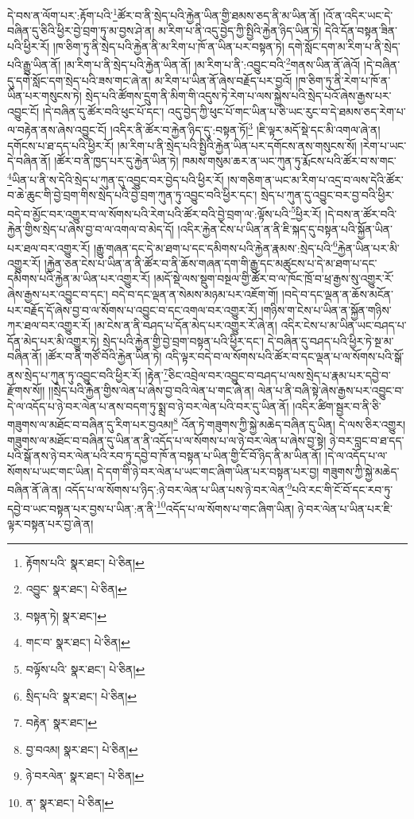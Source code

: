 དེ་བས་ན་ལོག་པར་:རྟོག་པའི་\footnote{རྟོགས་པའི་  སྣར་ཐང་།  པེ་ཅིན། }ཚོར་བ་ནི་སྲེད་པའི་རྐྱེན་ཡིན་གྱི་ཐམས་ཅད་ནི་མ་ཡིན་ནོ། །འོ་ན་འདིར་ཡང་དེ་བཞིན་དུ་ཅིའི་ཕྱིར་བྱེ་བྲག་ཏུ་མ་བྱས་ཤེ་ན། མ་རིག་པ་ནི་འདུ་བྱེད་ཀྱི་སྤྱིའི་རྐྱེན་ཉིད་ཡིན་ཏེ། དེའི་དོན་བསྟན་ཟིན་པའི་ཕྱིར་རོ། །ཁ་ཅིག་ཏུ་ནི་སྲེད་པའི་རྐྱེན་ནི་མ་རིག་པ་ཁོ་ན་ཡིན་པར་བསྟན་ཏེ། དགེ་སློང་དག་མ་རིག་པ་ནི་སྲེད་པའི་རྒྱུ་ཡིན་ནོ། །མ་རིག་པ་ནི་སྲེད་པའི་རྐྱེན་ཡིན་ནོ། །མ་རིག་པ་ནི་:འབྱུང་བའི་\footnote{འབྱུང་  སྣར་ཐང་།  པེ་ཅིན། }གནས་ཡིན་ནོ་ཞེའོ། །དེ་བཞིན་དུ་དགེ་སློང་དག་སྲེད་པའི་ཟས་གང་ཞེ་ན། མ་རིག་པ་ཡིན་ནོ་ཞེས་བརྗོད་པར་བྱའོ། །ཁ་ཅིག་ཏུ་ནི་རེག་པ་ཁོ་ན་ཡིན་པར་གསུངས་ཏེ། སྲེད་པའི་ཚོགས་དྲུག་ནི་མིག་གི་འདུས་ཏེ་རེག་པ་ལས་སྐྱེས་པའི་སྲེད་པའོ་ཞེས་རྒྱས་པར་འབྱུང་ངོ། །དེ་བཞིན་དུ་ཚོར་བའི་ཕུང་པོ་དང་། འདུ་བྱེད་ཀྱི་ཕུང་པོ་གང་ཡིན་པ་ཅི་ཡང་རུང་བ་དེ་ཐམས་ཅད་རེག་པ་ལ་བརྟེན་ནས་ཞེས་འབྱུང་ངོ། །འདིར་ནི་ཚོར་བ་རྐྱེན་ཉིད་དུ་:བསྟན་ཏོ།\footnote{བསྟན་ཏེ།  སྣར་ཐང་། } །ཇི་ལྟར་མདོ་སྡེ་དང་མི་འགལ་ཞེ་ན། དགོངས་པ་ཐ་དད་པའི་ཕྱིར་རོ། །མ་རིག་པ་ནི་སྲེད་པའི་སྤྱིའི་རྐྱེན་ཡིན་པར་དགོངས་ནས་གསུངས་སོ། །རེག་པ་ཡང་དེ་བཞིན་ནོ། །ཚོར་བ་ནི་ཁྱད་པར་དུ་རྐྱེན་ཡིན་ཏེ། ཁམས་གསུམ་ཆར་ན་ཡང་ཀུན་ཏུ་རྨོངས་པའི་ཚོར་བ་ས་གང་\footnote{གང་བ་  སྣར་ཐང་།  པེ་ཅིན། }ཡིན་པ་ནི་ས་དེའི་སྲེད་པ་ཀུན་དུ་འབྱུང་བར་བྱེད་པའི་ཕྱིར་རོ། །ས་གཅིག་ན་ཡང་མ་རིག་པ་འདྲ་བ་ལས་དེའི་ཚོར་བ་ཆེ་ཆུང་གི་བྱེ་བྲག་གིས་སྲེད་པའི་བྱེ་བྲག་ཀུན་ཏུ་འབྱུང་བའི་ཕྱིར་དང་། སྲེད་པ་ཀུན་དུ་འབྱུང་བར་བྱ་བའི་ཕྱིར་བདེ་བ་མྱོང་བར་འགྱུར་བ་ལ་སོགས་པའི་རེག་པའི་ཚོར་བའི་བྱེ་བྲག་ལ་:ལྟོས་པའི་\footnote{བལྟོས་པའི་  སྣར་ཐང་།  པེ་ཅིན། }ཕྱིར་རོ། །དེ་བས་ན་ཚོར་བའི་རྐྱེན་གྱིས་སྲེད་པ་ཞེས་བྱ་བ་ལ་འགལ་བ་མེད་དོ། །འདིར་རྐྱེན་ངེས་པ་ཡིན་ན་ནི་ཇི་སྐད་དུ་བསྟན་པའི་སྐྱོན་ཡིན་པར་ཐལ་བར་འགྱུར་རོ། །རྒྱུ་གཞན་དང་དེ་མ་ཐག་པ་དང་དམིགས་པའི་རྐྱེན་རྣམས་:སྲེད་པའི་\footnote{སྲིད་པའི་  སྣར་ཐང་།  པེ་ཅིན། }རྐྱེན་ཡིན་པར་མི་འགྱུར་རོ། །རྐྱེན་ཅན་ངེས་པ་ཡིན་ན་ནི་ཚོར་བ་ནི་ཆོས་གཞན་དག་གི་རྒྱུ་དང་མཚུངས་པ་དེ་མ་ཐག་པ་དང་དམིགས་པའི་རྐྱེན་མ་ཡིན་པར་འགྱུར་རོ། །མདོ་སྡེ་ལས་སྡུག་བསྔལ་གྱི་ཚོར་བ་ལ་ཁོང་ཁྲོ་བ་ཕྲ་རྒྱས་སུ་འགྱུར་རོ་ཞེས་རྒྱས་པར་འབྱུང་བ་དང་། བདེ་བ་དང་ལྡན་ན་སེམས་མཉམ་པར་འཇོག་གོ། །བདེ་བ་དང་ལྡན་ན་ཆོས་མངོན་པར་བརྗོད་དོ་ཞེས་བྱ་བ་ལ་སོགས་པ་འབྱུང་བ་དང་འགལ་བར་འགྱུར་རོ། །གཉིས་ག་ངེས་པ་ཡིན་ན་སྐྱོན་གཉིས་ཀར་ཐལ་བར་འགྱུར་རོ། །མ་ངེས་ན་ནི་བཤད་པ་དོན་མེད་པར་འགྱུར་རོ་ཞེ་ན། འདིར་ངེས་པ་མ་ཡིན་ཡང་བཤད་པ་དོན་མེད་པར་མི་འགྱུར་ཏེ། སྲེད་པའི་རྐྱེན་གྱི་བྱེ་བྲག་བསྟན་པའི་ཕྱིར་དང་། དེ་བཞིན་དུ་བཤད་པའི་ཕྱིར་ཏེ་སྔ་མ་བཞིན་ནོ། །ཚོར་བ་ནི་གཙོ་བོའི་རྐྱེན་ཡིན་ཏེ། འདི་ལྟར་བདེ་བ་ལ་སོགས་པའི་ཚོར་བ་དང་ལྡན་པ་ལ་སོགས་པའི་སྒོ་ནས་སྲེད་པ་ཀུན་ཏུ་འབྱུང་བའི་ཕྱིར་རོ། །རྟེན་\footnote{བརྟེན་  སྣར་ཐང་། }ཅིང་འབྲེལ་བར་འབྱུང་བ་བཤད་པ་ལས་སྲེད་པ་རྣམ་པར་དབྱེ་བ་རྫོགས་སོ།། །།སྲེད་པའི་རྐྱེན་གྱིས་ལེན་པ་ཞེས་བྱ་བའི་ལེན་པ་གང་ཞེ་ན། ལེན་པ་ནི་བཞི་སྟེ་ཞེས་རྒྱས་པར་འབྱུང་བ་དེ་ལ་འདོད་པ་ཉེ་བར་ལེན་པ་ནས་བདག་ཏུ་སྨྲ་བ་ཉེ་བར་ལེན་པའི་བར་དུ་ཡིན་ནོ། །འདིར་ཚིག་སྦྱར་བ་ནི་ཅི་གཟུགས་ལ་མཐོང་བ་བཞིན་དུ་རིག་པར་བྱའམ།\footnote{བྱ་བའམ།  སྣར་ཐང་།  པེ་ཅིན། } འོན་ཏེ་གཟུགས་ཀྱི་སྐྱེ་མཆེད་བཞིན་དུ་ཡིན། དེ་ལས་ཅིར་འགྱུར། གཟུགས་ལ་མཐོང་བ་བཞིན་དུ་ཡིན་ན་ནི་འདོད་པ་ལ་སོགས་པ་ལ་ཉེ་བར་ལེན་པ་ཞེས་བྱ་སྟེ། ཉེ་བར་བླང་བ་ཐ་དད་པའི་སྒོ་ནས་ཉེ་བར་ལེན་པའི་རབ་ཏུ་དབྱེ་བ་ཁོ་ན་བསྟན་པ་ཡིན་གྱི་ངོ་བོ་ཉིད་ནི་མ་ཡིན་ནོ། །དེ་ལ་འདོད་པ་ལ་སོགས་པ་ཡང་གང་ཡིན། དེ་དག་གི་ཉེ་བར་ལེན་པ་ཡང་གང་ཞིག་ཡིན་པར་བསྟན་པར་བྱ། གཟུགས་ཀྱི་སྐྱེ་མཆེད་བཞིན་ནོ་ཞེ་ན། འདོད་པ་ལ་སོགས་པ་ཉིད་:ཉེ་བར་ལེན་པ་ཡིན་པས་ཉེ་བར་ལེན་\footnote{ཉེ་བརལེན་  སྣར་ཐང་།  པེ་ཅིན། }པའི་རང་གི་ངོ་བོ་དང་རབ་ཏུ་དབྱེ་བ་ཡང་བསྟན་པར་བྱས་པ་ཡིན་:ན་ནི་\footnote{ན་  སྣར་ཐང་།  པེ་ཅིན། }འདོད་པ་ལ་སོགས་པ་གང་ཞིག་ཡིན། ཉེ་བར་ལེན་པ་ཡིན་པར་ཇི་ལྟར་བསྟན་པར་བྱ་ཞེ་ན། 